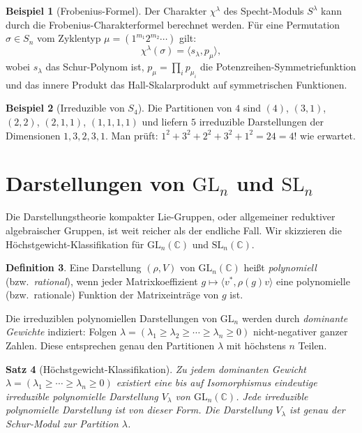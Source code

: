 \documentclass[12pt,a4paper]{amsart}
\newtheorem{theorem}{Satz}[section]
\theoremstyle{definition}
\newtheorem{definition}[theorem]{Definition}
\newtheorem{beispiel}[theorem]{Beispiel}
\begin{document}
\begin{beispiel}[Frobenius-Formel]
Der Charakter $\chi^\lambda$ des Specht-Moduls $S^\lambda$ kann durch die
Frobenius-Charakterformel berechnet werden.  Für eine Permutation $\sigma \in S_n$
vom Zyklentyp $\mu = (1^{m_1} 2^{m_2} \cdots)$ gilt:
\[
    \chi^\lambda(\sigma) = \langle s_\lambda, p_\mu \rangle,
\]
wobei $s_\lambda$ das Schur-Polynom ist, $p_\mu = \prod_i p_{\mu_i}$ die
Potenzreihen-Symmetriefunktion und das innere Produkt das Hall-Skalarprodukt
auf symmetrischen Funktionen.
\end{beispiel}

\begin{beispiel}[Irreduzible von $S_4$]
Die Partitionen von $4$ sind $(4)$, $(3,1)$, $(2,2)$, $(2,1,1)$, $(1,1,1,1)$
und liefern $5$ irreduzible Darstellungen der Dimensionen $1, 3, 2, 3, 1$.
Man prüft: $1^2 + 3^2 + 2^2 + 3^2 + 1^2 = 24 = 4!$ wie erwartet.
\end{beispiel}

\section{Darstellungen von $\mathrm{GL}_n$ und $\mathrm{SL}_n$}
\label{sec:gln}

Die Darstellungstheorie kompakter Lie-Gruppen, oder allgemeiner reduktiver
algebraischer Gruppen, ist weit reicher als der endliche Fall.  Wir skizzieren
die Höchstgewicht-Klassifikation für $\mathrm{GL}_n(\mathbb{C})$ und
$\mathrm{SL}_n(\mathbb{C})$.

\begin{definition}
Eine Darstellung $(\rho, V)$ von $\mathrm{GL}_n(\mathbb{C})$ heißt
\emph{polynomiell} (bzw.\ \emph{rational}), wenn jeder Matrixkoeffizient
$g \mapsto \langle v^*, \rho(g)v\rangle$ eine polynomielle (bzw.\ rationale)
Funktion der Matrixeinträge von $g$ ist.
\end{definition}

Die irreduziblen polynomiellen Darstellungen von $\mathrm{GL}_n$ werden durch
\emph{dominante Gewichte} indiziert: Folgen $\lambda = (\lambda_1 \geq \lambda_2
\geq \cdots \geq \lambda_n \geq 0)$ nicht-negativer ganzer Zahlen.  Diese
entsprechen genau den Partitionen $\lambda$ mit höchstens $n$ Teilen.

\begin{theorem}[Höchstgewicht-Klassifikation]
\label{satz:hoechstgewicht}
Zu jedem dominanten Gewicht $\lambda = (\lambda_1 \geq \cdots \geq \lambda_n \geq 0)$
existiert eine bis auf Isomorphismus eindeutige irreduzible polynomielle
Darstellung $V_\lambda$ von $\mathrm{GL}_n(\mathbb{C})$.  Jede irreduzible
polynomielle Darstellung ist von dieser Form.  Die Darstellung $V_\lambda$ ist
genau der Schur-Modul zur Partition $\lambda$.
\end{theorem}
\end{document}
